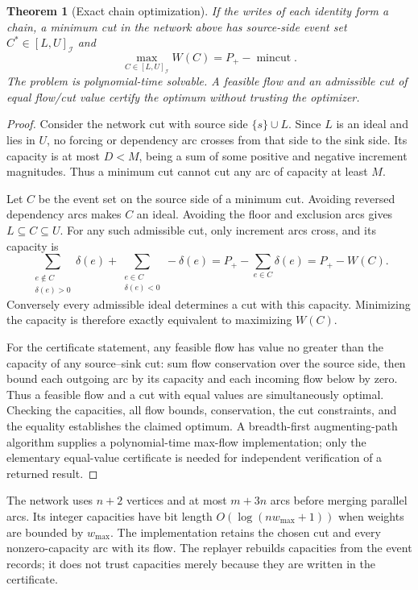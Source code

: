 \documentclass[11pt]{article}
\newtheorem{theorem}{Theorem}[section]
\theoremstyle{definition}
\newcommand{\Id}{\mathcal I}
\begin{document}
\begin{theorem}[Exact chain optimization]\label{thm:closure}
If the writes of each identity form a chain, a minimum cut in the network above has source-side event set $C^*\in[L,U]_{\Id}$ and
\begin{equation}\label{eq:optimum}
 \max_{C\in[L,U]_{\Id}}W(C)=P_+-\operatorname{mincut}.
\end{equation}
The problem is polynomial-time solvable. A feasible flow and an admissible cut of equal flow/cut value certify the optimum without trusting the optimizer.
\end{theorem}
\begin{proof}
Consider the network cut with source side $\{s\}\cup L$. Since $L$ is an ideal and lies in $U$, no forcing or dependency arc crosses from that side to the sink side. Its capacity is at most $D<M$, being a sum of some positive and negative increment magnitudes. Thus a minimum cut cannot cut any arc of capacity at least $M$.

Let $C$ be the event set on the source side of a minimum cut. Avoiding reversed dependency arcs makes $C$ an ideal. Avoiding the floor and exclusion arcs gives $L\subseteq C\subseteq U$. For any such admissible cut, only increment arcs cross, and its capacity is
\[
 \sum_{\substack{e\notin C\\\delta(e)>0}}\delta(e)
 +\sum_{\substack{e\in C\\\delta(e)<0}}-\delta(e)
 =P_+-\sum_{e\in C}\delta(e)=P_+-W(C).
\]
Conversely every admissible ideal determines a cut with this capacity. Minimizing the capacity is therefore exactly equivalent to maximizing $W(C)$.

For the certificate statement, any feasible flow has value no greater than the capacity of any source--sink cut: sum flow conservation over the source side, then bound each outgoing arc by its capacity and each incoming flow below by zero. Thus a feasible flow and a cut with equal values are simultaneously optimal. Checking the capacities, all flow bounds, conservation, the cut constraints, and the equality establishes the claimed optimum. A breadth-first augmenting-path algorithm supplies a polynomial-time max-flow implementation; only the elementary equal-value certificate is needed for independent verification of a returned result.
\end{proof}

The network uses $n+2$ vertices and at most $m+3n$ arcs before merging parallel arcs. Its integer capacities have bit length $O(\log(nw_{\max}+1))$ when weights are bounded by $w_{\max}$. The implementation retains the chosen cut and every nonzero-capacity arc with its flow. The replayer rebuilds capacities from the event records; it does not trust capacities merely because they are written in the certificate.
\end{document}
